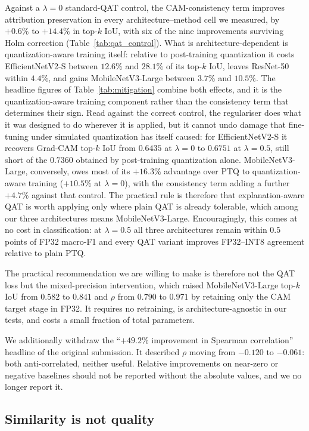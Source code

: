 \documentclass[fleqn,10pt]{wlscirep}
\begin{document}
Against a $\lambda = 0$ standard-QAT control, the CAM-consistency term improves attribution preservation in every architecture--method cell we measured, by $+0.6\%$ to $+14.4\%$ in top-$k$ IoU, with six of the nine improvements surviving Holm correction (Table~\ref{tab:qat_control}). What is architecture-dependent is quantization-aware training itself: relative to post-training quantization it costs EfficientNetV2-S between $12.6\%$ and $28.1\%$ of its top-$k$ IoU, leaves ResNet-50 within $4.4\%$, and gains MobileNetV3-Large between $3.7\%$ and $10.5\%$. The headline figures of Table~\ref{tab:mitigation} combine both effects, and it is the quantization-aware training component rather than the consistency term that determines their sign. Read against the correct control, the regulariser does what it was designed to do wherever it is applied, but it cannot undo damage that fine-tuning under simulated quantization has itself caused: for EfficientNetV2-S it recovers Grad-CAM top-$k$ IoU from $0.6435$ at $\lambda = 0$ to $0.6751$ at $\lambda = 0.5$, still short of the $0.7360$ obtained by post-training quantization alone. MobileNetV3-Large, conversely, owes most of its $+16.3\%$ advantage over PTQ to quantization-aware training ($+10.5\%$ at $\lambda = 0$), with the consistency term adding a further $+4.7\%$ against that control. The practical rule is therefore that explanation-aware QAT is worth applying only where plain QAT is already tolerable, which among our three architectures means MobileNetV3-Large. Encouragingly, this comes at no cost in classification: at $\lambda = 0.5$ all three architectures remain within $0.5$ points of FP32 macro-F1 and every QAT variant improves FP32--INT8 agreement relative to plain PTQ.

The practical recommendation we are willing to make is therefore not the QAT loss but the mixed-precision intervention, which raised MobileNetV3-Large top-$k$ IoU from $0.582$ to $0.841$ and $\rho$ from $0.790$ to $0.971$ by retaining only the CAM target stage in FP32. It requires no retraining, is architecture-agnostic in our tests, and costs a small fraction of total parameters.

We additionally withdraw the ``$+49.2\%$ improvement in Spearman correlation'' headline of the original submission. It described $\rho$ moving from $-0.120$ to $-0.061$: both anti-correlated, neither useful. Relative improvements on near-zero or negative baselines should not be reported without the absolute values, and we no longer report it.

\subsection*{Similarity is not quality}
\end{document}
